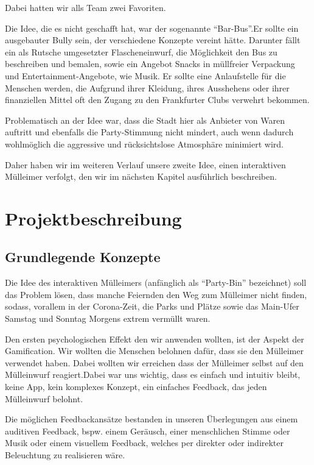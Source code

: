     Dabei hatten wir alls Team zwei Favoriten.

    Die Idee, die es nicht geschafft hat, war der sogenannte \enquote{Bar-Bus}.Er sollte ein ausgebauter Bully sein, der verschiedene Konzepte vereint hätte. Darunter fällt ein  als Rutsche umgesetzter Flascheneinwurf, die Möglichkeit den Bus zu beschreiben und bemalen, sowie ein Angebot Snacks in müllfreier Verpackung und Entertainment-Angebote, wie Musik.
    Er sollte eine Anlaufstelle für die Menschen werden, die Aufgrund ihrer Kleidung, ihres Ausshehens oder ihrer finanziellen Mittel oft den Zugang  zu den Frankfurter Clubs verwehrt bekommen.

    Problematisch an der Idee war, dass die Stadt hier als Anbieter von Waren auftritt und ebenfalls die Party-Stimmung nicht mindert, auch wenn dadurch wohlmöglich die aggressive und rücksichtslose Atmosphäre minimiert wird.

    Daher haben wir im weiteren Verlauf unsere zweite Idee, einen interaktiven Mülleimer verfolgt, den wir im nächsten Kapitel ausführlich beschreiben.


\chapter{Projektbeschreibung}

\section{Grundlegende Konzepte}
    
    Die Idee des interaktiven Mülleimers (anfänglich als \enquote{Party-Bin} bezeichnet) soll das Problem lösen, dass manche Feiernden den Weg zum Mülleimer nicht finden, sodass, vorallem in der Corona-Zeit, die Parks und Plätze sowie das Main-Ufer Samstag und Sonntag Morgens extrem vermüllt waren.

    Den ersten psychologischen Effekt den wir anwenden wollten, ist der Aspekt der Gamification. Wir wollten die Menschen belohnen dafür, dass sie den Mülleimer verwendet haben. Dabei wollten wir erreichen dass der Mülleimer selbst auf den Mülleinwurf reagiert.Dabei war uns wichtig, dass es einfach und intuitiv bleibt, keine App, kein komplexes Konzept, ein einfaches Feedback, das jeden Mülleinwurf belohnt.

    Die möglichen Feedbackansätze bestanden in unseren Überlegungen aus einem auditiven Feedback, bspw. einem Geräusch, einer menschlichen Stimme oder  Musik oder einem visuellem Feedback, welches per direkter oder indirekter Beleuchtung zu realisieren wäre.

